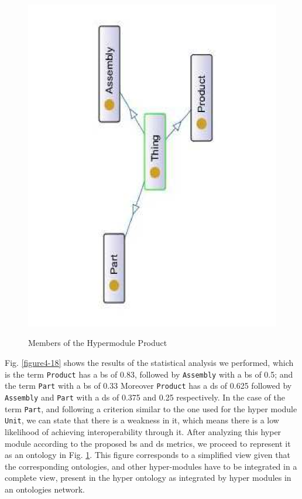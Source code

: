 \begin{figure}
\begin{center}
	\includegraphics[scale=0.5, angle=270]{figure-chapterIV/fig4-19}\\
	\vspace{-20mm}
	\caption{Members of the Hypermodule Product}
	\label{figure4-19}
\end{center}
\end{figure}


Fig. \ref{figure4-18} shows the results of the statistical analysis we performed, which is the term \texttt{Product} has a \gls{bs} of 0.83, followed by \texttt{Assembly} with a \gls{bs} of 0.5; and the term \texttt{Part} with a \gls{bs} of 0.33 Moreover \texttt{Product} has a \gls{ds} of 0.625 followed by \texttt{Assembly} and \texttt{Part} with a \gls{ds} of 0.375 and 0.25 respectively. In the case of the term \texttt{Part}, and following a criterion similar to the one used for the hyper module \texttt{Unit}, we can state that there is a weakness in it, which means there is a low likelihood of achieving interoperability through it.  After analyzing  this hyper module according to the proposed \gls{bs} and \gls{ds} metrics, we proceed to represent it as an ontology in Fig. \ref{figure4-19}. This figure corresponds to a simplified view given that the corresponding ontologies, and other hyper-modules have to be integrated in a complete view, present in the hyper ontology as integrated by hyper modules in an ontologies network. 


